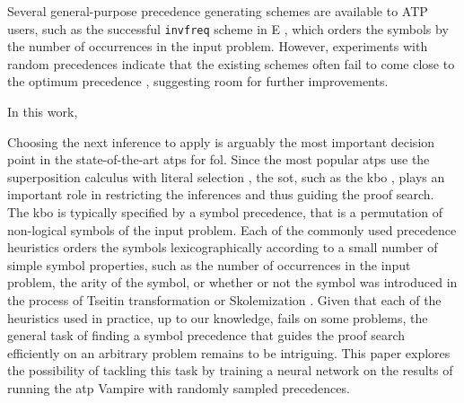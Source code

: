 
Several general-purpose precedence generating schemes are available to ATP users,
such as the successful \texttt{invfreq} scheme in E \cite{E-manual}, which orders the symbols 
by the number of occurrences in the input problem. However, experiments with random precedences
indicate that the existing schemes often fail to come close to the optimum precedence \cite{RegerSuda2017},
suggesting room for further improvements.

In this work, 

\newpage









Choosing the next inference to apply is arguably the most important decision point in the state-of-the-art
\glspl{atp} for \gls{fol}.
Since the most popular \glspl{atp} use the superposition calculus with literal selection \cite{DBLP:journals/logcom/BachmairG94},
the \gls{sot}, such as the \gls{kbo} \cite{Knuth1983},
plays an important role in restricting the inferences and thus guiding the proof search.
The \gls{kbo} is typically specified by a symbol precedence,
that is a permutation of non-logical symbols of the input problem.
Each of the commonly used precedence heuristics orders the symbols
lexicographically according to a small number of simple
symbol properties,
such as the number of occurrences in the input problem,
the arity of the symbol, or
whether or not the symbol was introduced in the process of Tseitin transformation \cite{Tseitin1983} or Skolemization \cite{Harrison2009}.
Given that each of the heuristics used in practice, up to our knowledge, fails on some problems,
the general task of
finding a symbol precedence that guides the proof search efficiently on an arbitrary problem
remains to be intriguing.
This paper explores the possibility of tackling this task by training a neural network
on the results of running the \gls{atp} Vampire \cite{10.1007/978-3-642-39799-8_1} with randomly sampled precedences.

